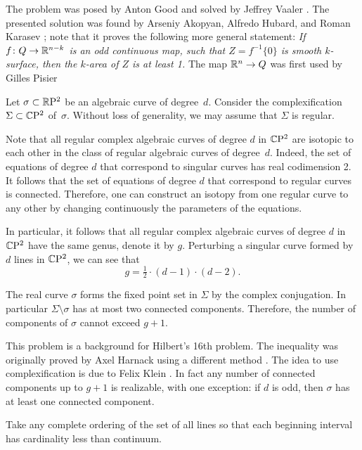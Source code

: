 The problem was posed by Anton Good
and solved by Jeffrey Vaaler \cite{vaaler}.
The presented solution was found by Arseniy Akopyan, Alfredo Hubard, and Roman Karasev \cite{akopyan-hubard-karasev};
note that it proves the following more general statement:
\textit{If $f\colon Q \to \mathbb{R}^{n-k}$ is an odd continuous map, such that $Z = f^{-1}\{0\}$ is smooth $k$-surface, then the $k$-area of $Z$ is at least 1.}
The map $\mathbb{R}^n\to Q$ was first used by Gilles Pisier \cite[p. 182]{pisier}



Let $\sigma\subset \mathbb{R}\mathrm{P}^2$ be an algebraic curve of degree~$d$.
Consider the complexification $\Sigma\subset \mathbb{C}\mathrm{P}^2$ of~$\sigma$.
Without loss of generality, we may assume that $\Sigma$ is regular.

Note that all regular complex algebraic curves of degree $d$ in $\mathbb{C}\mathrm{P}^2$
are isotopic to each other in the class of regular algebraic curves of degree~$d$.
Indeed, the set of equations of degree $d$ that correspond to singular curves has real codimension 2.
It follows that the set of equations of degree $d$ that correspond to regular curves is connected.
Therefore, one can construct an isotopy from one regular curve to any other by changing continuously the parameters of the equations.

In particular, it follows that all regular complex algebraic curves of degree $d$ in $\mathbb{C}\mathrm{P}^2$ have the same genus,
denote it by $g$.
Perturbing a singular curve formed by $d$ lines in $\mathbb{C}\mathrm{P}^2$,
we can see that 
\[g=\tfrac12\cdot(d-1)\cdot(d-2).\]

The real curve $\sigma$ forms the fixed point set in $\Sigma$ by the complex conjugation.
In particular $\Sigma\setminus\sigma$ has at most two connected components.
Therefore, the number of components of $\sigma$ cannot exceed $g+1$.
\qeds

This problem is a background for Hilbert's 16th problem.
The inequality was originally proved 
by Axel Harnack using a different method \cite{harnack}.
The idea to use complexification is due to Felix Klein \cite{klein}.
In fact any number of connected components up to $g+1$ is realizable, with one exception:
if $d$ is odd, then $\sigma$ has at least one connected component. 

Take any complete ordering of the set of all lines 
so that each beginning interval has cardinality less than continuum.

